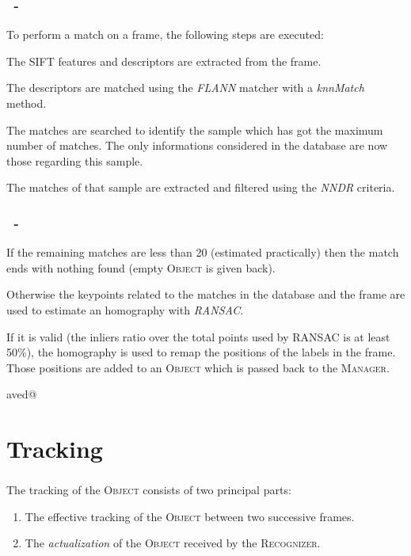 \documentclass{beamer}
\makeatletter
\newenvironment{cenumerate}{
  \enumerate
  \setcounter{\@enumctr}{\csname saved@\@enumctr\endcsname}
}{
  \expandafter\xdef\csname saved@\@enumctr\endcsname{\the\value{\@enumctr}}
  \endenumerate
}
\newenvironment{cenumerate*}{
  \enumerate
}{
  \expandafter\xdef\csname saved@\@enumctr\endcsname{\the\value{\@enumctr}}
  \endenumerate
}
\makeatother
\begin{document}
  \begin{frame}
    \frametitle{\insertsection\ - \insertsubsection}
    To perform a match on a frame, the following steps are executed:
    \begin{cenumerate*}
      \item The SIFT features and descriptors are extracted from the frame.
      \item The descriptors are matched using the \emph{FLANN} matcher with
        a \emph{knnMatch} method.
      \item The matches are searched to identify the sample which has got 
        the maximum number of matches. The only informations considered in
        the database are now those regarding this sample.
      \item The matches of that sample are extracted and filtered using the
        \emph{NNDR} criteria.
    \end{cenumerate*}
  \end{frame}

  \begin{frame}
    \frametitle{\insertsection\ - \insertsubsection}
    \begin{cenumerate}
      \item If the remaining matches are less than 20 (estimated practically)
        then the match ends with nothing found (empty \textsc{Object} is given
        back).
      \item Otherwise the keypoints related to the matches in the database and
        the frame are used to estimate an homography with \emph{RANSAC}.
      \item If it is valid (the inliers ratio over the total points used by
        RANSAC is at least 50\%), the homography is used to remap the positions
        of the labels in the frame. Those positions are added to an
        \textsc{Object} which is passed back to the \textsc{Manager}.
    \end{cenumerate}
  \end{frame}

  \section{Tracking}

  \begin{frame}
    \frametitle{\insertsection}
    The tracking of the \textsc{Object} consists of two principal parts:
    \begin{enumerate}
      \item The effective tracking of the \textsc{Object} between two
        successive frames.
      \item The \emph{actualization} of the \textsc{Object} received by the
        \textsc{Recognizer}.
    \end{enumerate}
  \end{frame}
\end{document}
